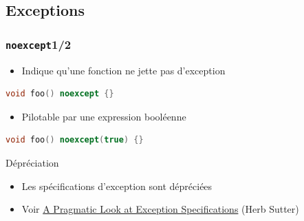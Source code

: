 \documentclass[C++.tex]{subfiles}
\begin{document}
\subsection*{Exceptions}
\begin{frame}[fragile]
	\frametitle{\lstinline|noexcept|\titlehfill{}1/2}
	\begin{itemize}
		\item Indique qu'une fonction ne jette pas d'exception

	\end{itemize}

	\begin{lstlisting}[language=C++]
void foo() noexcept {}\end{lstlisting}

	\begin{itemize}
		\item Pilotable par une expression booléenne
	\end{itemize}

	\begin{lstlisting}[language=C++]
void foo() noexcept(true) {}\end{lstlisting}

	\begin{block}{Dépréciation}
		\begin{itemize}
			\item Les spécifications d'exception sont dépréciées
			\item Voir \href{http://www.gotw.ca/publications/mill22.htm}{A Pragmatic Look at Exception Specifications} (Herb Sutter)
		\end{itemize}

	\end{block}
\end{frame}
\end{document}
